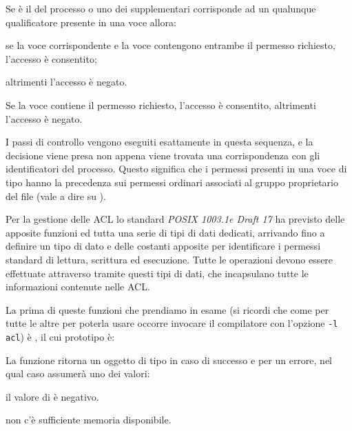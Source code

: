 \begin{enumerate*}
\item Se è il  del processo o uno dei  supplementari
  corrisponde ad un qualunque qualificatore presente in una voce
   allora:
  \begin{itemize*}
  \item se la voce  corrispondente e la voce
     contengono entrambe il permesso richiesto, l'accesso è
    consentito;
  \item altrimenti l'accesso è negato.
  \end{itemize*}
\item Se la voce  contiene il permesso richiesto,
  l'accesso è consentito, altrimenti l'accesso è negato.
\end{enumerate*}

I passi di controllo vengono eseguiti esattamente in questa sequenza, e la
decisione viene presa non appena viene trovata una corrispondenza con gli
identificatori del processo. Questo significa che i permessi presenti in una
voce di tipo  hanno la precedenza sui permessi ordinari
associati al gruppo proprietario del file (vale a dire su
).

Per la gestione delle ACL lo standard \textit{POSIX 1003.1e Draft 17} ha
previsto delle apposite funzioni ed tutta una serie di tipi di dati dedicati,
arrivando fino a definire un tipo di dato e delle costanti apposite per
identificare i permessi standard di lettura, scrittura ed esecuzione.  Tutte
le operazioni devono essere effettuate attraverso tramite questi tipi di dati,
che incapsulano tutte le informazioni contenute nelle ACL.

La prima di queste funzioni che prendiamo in esame (si ricordi che come per
tutte le altre per poterla usare occorre invocare il compilatore con l'opzione
\texttt{-l acl}) è , il cui prototipo è:

\begin{funcproto}{
}

{La funzione ritorna un oggetto di tipo  in caso di successo e
   per un errore, nel qual caso  assumerà uno dei valori:
  \begin{errlist}
  \item[\errcode{EINVAL}] il valore di  è negativo.
  \item[\errcode{ENOMEM}] non c'è sufficiente memoria disponibile.
  \end{errlist}
}
\end{funcproto}

